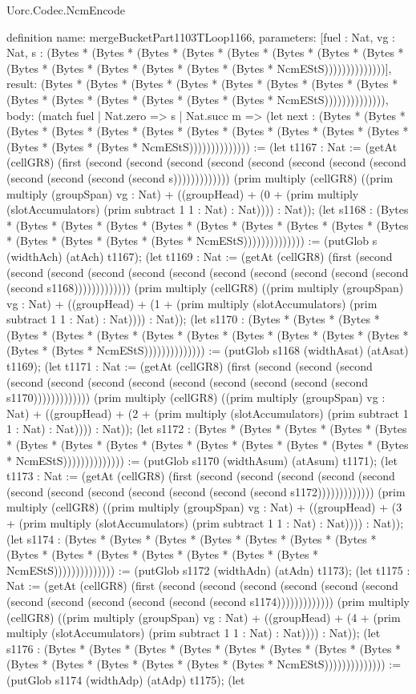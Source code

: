 \begin{lexlean}{Uorc.Codec.NcmEncode}
\begin{semanticmodule}
definition{
  name: mergeBucketPart1103TLoop1166,
  parameters: [fuel : Nat, vg : Nat, s : (Bytes * (Bytes * (Bytes * (Bytes * (Bytes * (Bytes * (Bytes * (Bytes * (Bytes * (Bytes * (Bytes * (Bytes * (Bytes * (Bytes * NcmEStS))))))))))))))],
  result: (Bytes * (Bytes * (Bytes * (Bytes * (Bytes * (Bytes * (Bytes * (Bytes * (Bytes * (Bytes * (Bytes * (Bytes * (Bytes * (Bytes * NcmEStS)))))))))))))),
  body: (match fuel
    | Nat.zero => s
    | Nat.succ m => (let next : (Bytes * (Bytes * (Bytes * (Bytes * (Bytes * (Bytes * (Bytes * (Bytes * (Bytes * (Bytes * (Bytes * (Bytes * (Bytes * (Bytes * NcmEStS)))))))))))))) := (let t1167 : Nat := (getAt (cellGR8) (first (second (second (second (second (second (second (second (second (second (second (second (second s))))))))))))) (prim multiply (cellGR8) ((prim multiply (groupSpan) vg : Nat) + ((groupHead) + (0 + (prim multiply (slotAccumulators) (prim subtract 1 1 : Nat) : Nat)))) : Nat)); (let s1168 : (Bytes * (Bytes * (Bytes * (Bytes * (Bytes * (Bytes * (Bytes * (Bytes * (Bytes * (Bytes * (Bytes * (Bytes * (Bytes * (Bytes * NcmEStS)))))))))))))) := (putGlob s (widthAch) (atAch) t1167); (let t1169 : Nat := (getAt (cellGR8) (first (second (second (second (second (second (second (second (second (second (second (second (second s1168))))))))))))) (prim multiply (cellGR8) ((prim multiply (groupSpan) vg : Nat) + ((groupHead) + (1 + (prim multiply (slotAccumulators) (prim subtract 1 1 : Nat) : Nat)))) : Nat)); (let s1170 : (Bytes * (Bytes * (Bytes * (Bytes * (Bytes * (Bytes * (Bytes * (Bytes * (Bytes * (Bytes * (Bytes * (Bytes * (Bytes * (Bytes * NcmEStS)))))))))))))) := (putGlob s1168 (widthAsat) (atAsat) t1169); (let t1171 : Nat := (getAt (cellGR8) (first (second (second (second (second (second (second (second (second (second (second (second (second s1170))))))))))))) (prim multiply (cellGR8) ((prim multiply (groupSpan) vg : Nat) + ((groupHead) + (2 + (prim multiply (slotAccumulators) (prim subtract 1 1 : Nat) : Nat)))) : Nat)); (let s1172 : (Bytes * (Bytes * (Bytes * (Bytes * (Bytes * (Bytes * (Bytes * (Bytes * (Bytes * (Bytes * (Bytes * (Bytes * (Bytes * (Bytes * NcmEStS)))))))))))))) := (putGlob s1170 (widthAsum) (atAsum) t1171); (let t1173 : Nat := (getAt (cellGR8) (first (second (second (second (second (second (second (second (second (second (second (second (second s1172))))))))))))) (prim multiply (cellGR8) ((prim multiply (groupSpan) vg : Nat) + ((groupHead) + (3 + (prim multiply (slotAccumulators) (prim subtract 1 1 : Nat) : Nat)))) : Nat)); (let s1174 : (Bytes * (Bytes * (Bytes * (Bytes * (Bytes * (Bytes * (Bytes * (Bytes * (Bytes * (Bytes * (Bytes * (Bytes * (Bytes * (Bytes * NcmEStS)))))))))))))) := (putGlob s1172 (widthAdn) (atAdn) t1173); (let t1175 : Nat := (getAt (cellGR8) (first (second (second (second (second (second (second (second (second (second (second (second (second s1174))))))))))))) (prim multiply (cellGR8) ((prim multiply (groupSpan) vg : Nat) + ((groupHead) + (4 + (prim multiply (slotAccumulators) (prim subtract 1 1 : Nat) : Nat)))) : Nat)); (let s1176 : (Bytes * (Bytes * (Bytes * (Bytes * (Bytes * (Bytes * (Bytes * (Bytes * (Bytes * (Bytes * (Bytes * (Bytes * (Bytes * (Bytes * NcmEStS)))))))))))))) := (putGlob s1174 (widthAdp) (atAdp) t1175); (let }
\end{semanticmodule}
\end{lexlean}
